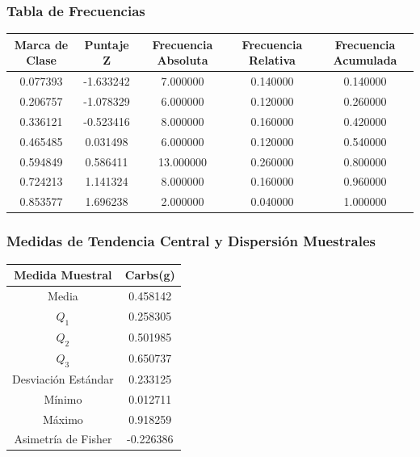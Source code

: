 \documentclass[12pt,a4paper]{article}
\begin{document}
    \subsubsection{Tabla de Frecuencias}
        \begin{center}
            \begin{tabular}{|c|c|c|c|c|}
                \hline
                Marca de Clase & Puntaje Z & Frecuencia Absoluta & Frecuencia Relativa & Frecuencia Acumulada \\
                \hline
                0.077393 & -1.633242 & 7.000000 & 0.140000 & 0.140000 \\
                0.206757 & -1.078329 & 6.000000 & 0.120000 & 0.260000 \\
                0.336121 & -0.523416 & 8.000000 & 0.160000 & 0.420000 \\
                0.465485 & 0.031498 & 6.000000 & 0.120000 & 0.540000 \\
                0.594849 & 0.586411 & 13.000000 & 0.260000 & 0.800000 \\
                0.724213 & 1.141324 & 8.000000 & 0.160000 & 0.960000 \\
                0.853577 & 1.696238 & 2.000000 & 0.040000 & 1.000000 \\
                \hline
            \end{tabular}
        \end{center}

    \subsubsection{Medidas de Tendencia Central y Dispersión Muestrales}
        \begin{center}
            \begin{tabular}{|c|c|}
                \hline
                Medida Muestral & Carbs(g) \\
                \hline
                Media & 0.458142  \\
                $Q_1$ & 0.258305 \\
                $Q_2$ & 0.501985 \\
                $Q_3$ & 0.650737 \\
                Desviación Estándar & 0.233125 \\
                Mínimo & 0.012711 \\
                Máximo & 0.918259 \\
                Asimetría de Fisher & -0.226386 \\
                \hline
            \end{tabular}
        \end{center}
\end{document}
